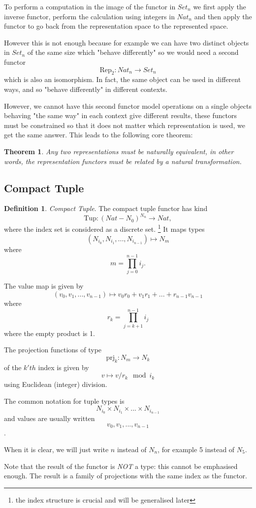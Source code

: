 \documentclass[oneside]{book}
\theoremstyle{plain}
\theoremstyle{definition}
\newtheorem{definition}{Definition}
\theoremstyle{plain}
\newtheorem{theorem}{Theorem}
\def\Set{\mathit{Set}}
\def\Nat{\mathit{Nat}}
\begin{document}
To perform a computation in the image of the functor in $\Set_n$ 
we first apply the inverse functor, perform the calculation using integers in $\Nat_n$
and then apply the functor to go back from the representation space to the represented space.

However this is not enough because for example we can have two distinct objects in $\Set_n$
of the same size which "behave differently" so we would need a second functor 
\begin{equation}
\mathrm{Rep_2}: \Nat_n\rightarrow \Set_n
\end{equation}
which is also an isomorphism. In fact, the same object can be used in different ways,
and so "behave differently" in different contexts.

However, we cannot have this second functor model operations on a single objects
behaving "the same way" in each context give different results, these functors
must be constrained so that it does not matter which representation is used, 
we get the same answer. This leads to the following core theorem:
\begin{theorem}
Any two representations must be naturally equivalent, in other words,
the representation functors must be related by a natural transformation.
\end{theorem}



\subsection{Compact Tuple}
\begin{definition} {\em Compact Tuple}.
The compact tuple functor has kind 
$$\mathrm{Tup}: (Nat-N_0)^{\mathit{N_n}}\rightarrow \Nat,$$
where the index set is considered as a discrete set.
\footnote{the index structure is crucial and will be generalised later} 
It maps types
$$(N_{i_0}, N_{i_1}, ... , N_{i_{n-1}}) \mapsto N_m$$
where 
$$m=\prod_{j=0}^{n-1}i_j.$$ 

The value map is given by
$$(v_0, v_1, ... ,v_{n-1}) \mapsto
v_0  r_0 + v_1  r_1 + ... + r_{n-1}  v_{n-1}$$
where
$$r_k = \prod_{j=k+1}^{n-1}i_j$$
where the empty product is 1.
 
The projection functions of type 
$$\mathrm{prj}_k: N_m\rightarrow N_k$$
of the $k'th$ index is given by 
$$v \mapsto v / r_k \mod i_k$$
using Euclidean (integer) division.

The common notation for tuple types is
$$N_{i_0} \times N_{i_1} \times ... \times N_{i_{n-1}}$$
and values are usually written
$$v_0, v_1, ... ,v_{n-1}$$.

When it is clear, we will just write $n$ instead of $N_n$, for
example 5 instead of $N_5$.

Note that the result of the functor is {\em NOT} a type: this cannot be
emphasised enough. The result is a family of projections with the
same index as the functor.
\end{definition}
\end{document}
